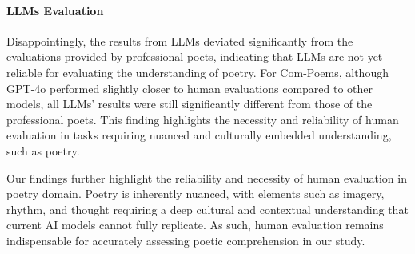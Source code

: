 \documentclass[11pt]{article}
\begin{document}
\paragraph{LLMs Evaluation}
Disappointingly, the results from LLMs deviated significantly from the evaluations provided by professional poets, indicating that LLMs are not yet reliable for evaluating the understanding of poetry. For Com-Poems, although GPT-4o performed slightly closer to human evaluations compared to other models, all LLMs' results were still significantly different from those of the professional poets. This finding highlights the necessity and reliability of human evaluation in tasks requiring nuanced and culturally embedded understanding, such as poetry.

Our findings further highlight the reliability and necessity of human evaluation in poetry domain. Poetry is inherently nuanced, with elements such as imagery, rhythm, and thought requiring a deep cultural and contextual understanding that current AI models cannot fully replicate. As such, human evaluation remains indispensable for accurately assessing poetic comprehension in our study.







\end{document}

